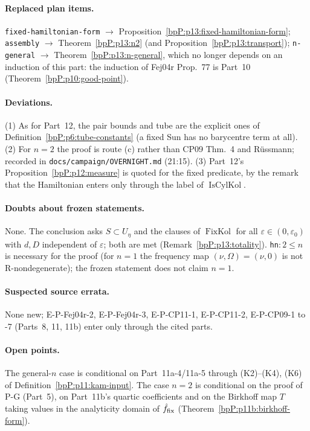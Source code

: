 \paragraph{Replaced plan items.} \texttt{fixed-hamiltonian-form} $\to$ Proposition~\ref{bpP:p13:fixed-hamiltonian-form}; \texttt{assembly} $\to$ Theorem~\ref{bpP:p13:n2} (and Proposition~\ref{bpP:p13:transport}); \texttt{n-general} $\to$ Theorem~\ref{bpP:p13:n-general}, which no longer depends on an induction of this part: the induction of Fej04r Prop.~77 is Part~10 (Theorem~\ref{bpP:p10:good-point}).

\paragraph{Deviations.} (1) As for Part~12, the pair bounds and tube are the explicit ones of Definition~\ref{bpP:p6:tube-constants} (a fixed Sun has no barycentre term at all). (2) For $n=2$ the proof is route (c) rather than CP09 Thm.~4 and R\"ussmann; recorded in \texttt{docs/campaign/OVERNIGHT.md} (21:15). (3) Part~12's Proposition~\ref{bpP:p12:measure} is quoted for the fixed predicate, by the remark that the Hamiltonian enters only through the label of $\operatorname{IsCylKol}$.

\paragraph{Doubts about frozen statements.} None. The conclusion asks $S\subset U_\eta$ and the clauses of $\operatorname{FixKol}$ for all $\varepsilon\in(0,\varepsilon_0)$ with $d,D$ independent of $\varepsilon$; both are met (Remark~\ref{bpP:p13:totality}). \texttt{hn}$:2\le n$ is necessary for the proof (for $n=1$ the frequency map $(\nu,\Omega)=(\nu,0)$ is not R-nondegenerate); the frozen statement does not claim $n=1$.

\paragraph{Suspected source errata.} None new; E-P-Fej04r-2, E-P-Fej04r-3, E-P-CP11-1, E-P-CP11-2, E-P-CP09-1 to -7 (Parts~8, 11, 11b) enter only through the cited parts.

\paragraph{Open points.} The general-$n$ case is conditional on Part~11a-4/11a-5 through (K2)--(K4), (K6) of Definition~\ref{bpP:p11:kam-input}. The case $n=2$ is conditional on the proof of P-G (Part~5), on Part~11b's quartic coefficients and on the Birkhoff map $T$ taking values in the analyticity domain of $\hat f_{\rm fix}$ (Theorem~\ref{bpP:p11b:birkhoff-form}).

